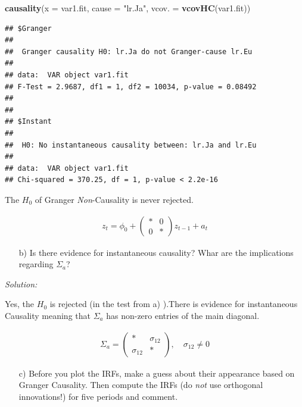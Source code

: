 \documentclass[12pt,a4paper]{article}
\newenvironment{Shaded}{\begin{snugshade}}{\end{snugshade}}
\newcommand{\DataTypeTok}[1]{\textcolor[rgb]{0.13,0.29,0.53}{#1}}
\newcommand{\KeywordTok}[1]{\textcolor[rgb]{0.13,0.29,0.53}{\textbf{#1}}}
\newcommand{\NormalTok}[1]{#1}
\newcommand{\StringTok}[1]{\textcolor[rgb]{0.31,0.60,0.02}{#1}}
\begin{document}
\begin{Shaded}
\begin{Highlighting}[]
\KeywordTok{causality}\NormalTok{(}\DataTypeTok{x =}\NormalTok{ var1.fit, }\DataTypeTok{cause =} \StringTok{"lr.Ja"}\NormalTok{, }\DataTypeTok{vcov. =} \KeywordTok{vcovHC}\NormalTok{(var1.fit))}
\end{Highlighting}
\end{Shaded}

\begin{verbatim}
## $Granger
## 
##  Granger causality H0: lr.Ja do not Granger-cause lr.Eu
## 
## data:  VAR object var1.fit
## F-Test = 2.9687, df1 = 1, df2 = 10034, p-value = 0.08492
## 
## 
## $Instant
## 
##  H0: No instantaneous causality between: lr.Ja and lr.Eu
## 
## data:  VAR object var1.fit
## Chi-squared = 370.25, df = 1, p-value < 2.2e-16
\end{verbatim}

The \(H_0\) of Granger \emph{Non}-Causality is never rejected.

\begin{align*}
  z_t = \phi_0 + \begin{pmatrix} \ast & 0 \\ 0 & \ast \end{pmatrix} z_{t - 1} + a_t
\end{align*}

\begin{itemize}
  \item[b)] Is there evidence for instantaneous causality? Whar are the implications regarding $\Sigma_a$?
\end{itemize}

\emph{Solution:}

Yes, the \(H_0\) is rejected (in the test from a) ).There is evidence
for instantaneous Causality meaning that \(\Sigma_a\) has non-zero
entries of the main diagonal.

\begin{align*}
  \Sigma_a = \begin{pmatrix} \ast & \sigma_{12}  \\ \sigma_{12} & \ast \end{pmatrix} , \quad \sigma_{12} \neq 0 
\end{align*}

\begin{itemize}
  \item[c)] Before you plot the IRFs, make a guess about their appearance based on Granger Causality. Then compute the IRFs (do \emph{not} use orthogonal innovations!) for five periods and comment.
\end{itemize}
\end{document}

